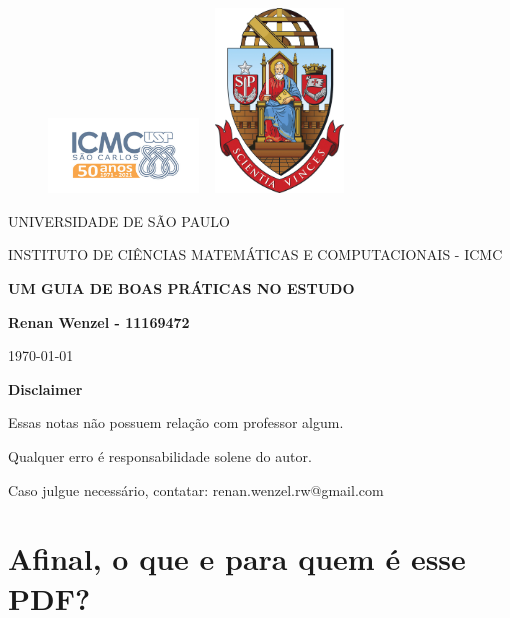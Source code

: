 \documentclass{article}
\begin{document}
 \begin{figure}[ht]
    \includegraphics[width=4cm]{icmc.png}
    \hspace{7cm}
    \includegraphics[height=4.9cm,width=4cm]{brasao_usp_cor.jpg}
  \endminipage  
\end{figure}

\begin{center}
  \vspace{1cm}
  \LARGE
  UNIVERSIDADE DE S\~AO PAULO

  \vspace{1.3cm}
  \LARGE
  INSTITUTO DE CI\^ENCIAS MATEM\'ATICAS E COMPUTACIONAIS - ICMC

  \vspace{1.7cm}
  \Large
  \textbf{UM GUIA DE BOAS PRÁTICAS NO ESTUDO}

  \vspace{1.3cm}
  \large
  \textbf{Renan Wenzel - 11169472}

  \vspace{6.3cm}
  \today
\end{center}

 \newpage
\textbf{{\Huge Disclaimer}}
 \vspace{5cm}

  {\huge Essas notas não possuem relação com professor algum. 

  Qualquer erro é responsabilidade solene do autor.

Caso julgue necessário, contatar: renan.wenzel.rw@gmail.com}
\newpage
\tableofcontents

\newpage
\section{Afinal, o que e para quem é esse PDF?}
\end{document}
